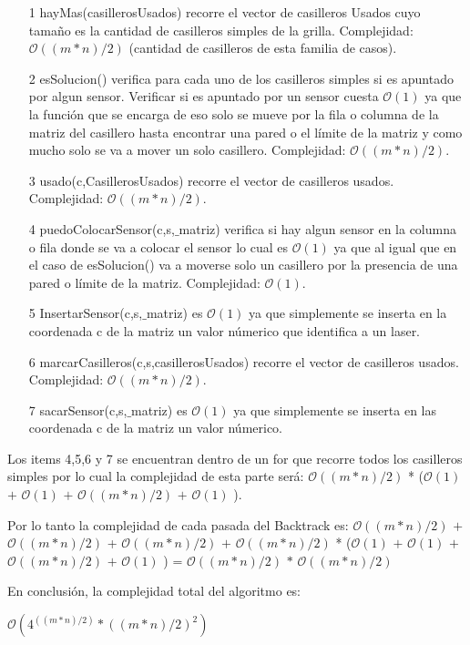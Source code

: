 \begin{itemize}
	\item[1] hayMas(casillerosUsados) recorre el vector de casilleros Usados cuyo tamaño es la cantidad de casilleros simples de la grilla. Complejidad: $\mathcal{O}((m*n)/2)$ (cantidad de casilleros de esta familia de casos).
	\item[2] esSolucion() verifica para cada uno de los casilleros simples si es apuntado por algun sensor. Verificar si es apuntado por un sensor cuesta $\mathcal{O}(1)$ ya que la función que se encarga de eso solo se mueve por la fila o columna de la matriz del casillero hasta encontrar una pared o el límite de la matriz y como mucho solo se va a mover un solo casillero. Complejidad: $\mathcal{O}((m*n)/2)$.
	\item[3] usado(c,CasillerosUsados) recorre el vector de casilleros usados. Complejidad: $\mathcal{O}((m*n)/2)$.
	\item[4] puedoColocarSensor(c,s,$\_$matriz) verifica si hay algun sensor en la columna o fila donde se va a colocar el sensor lo cual es $\mathcal{O}(1)$ ya que al igual que en el caso de esSolucion() va a moverse solo un casillero por la presencia de una pared o límite de la matriz. Complejidad: $\mathcal{O}(1)$.
	\item[5] InsertarSensor(c,s,$\_$matriz) es $\mathcal{O}(1)$ ya que simplemente se inserta en la coordenada c de la matriz un valor númerico que identifica a un laser.
	\item[6] marcarCasilleros(c,s,casillerosUsados) recorre el vector de casilleros usados. Complejidad: $\mathcal{O}((m*n)/2)$.
	\item[7] sacarSensor(c,s,$\_$matriz) es $\mathcal{O}(1)$ ya que simplemente se inserta en las coordenada c de la matriz un valor númerico.
\end{itemize}

Los items 4,5,6 y 7 se encuentran dentro de un for que recorre todos los casilleros simples por lo cual la complejidad de esta parte será: $\mathcal{O}((m*n)/2)$ * ($\mathcal{O}(1)$ $+$ $\mathcal{O}(1)$ $+$ $\mathcal{O}((m*n)/2)$ $+$ $\mathcal{O}(1)$ ).

Por lo tanto la complejidad de cada pasada del Backtrack es:
$\mathcal{O}((m*n)/2)$ $+$ $\mathcal{O}((m*n)/2)$ + $\mathcal{O}((m*n)/2)$ $+$ $\mathcal{O}((m*n)/2)$ * ($\mathcal{O}(1)$ $+$ $\mathcal{O}(1)$ $+$ $\mathcal{O}((m*n)/2)$ $+$ $\mathcal{O}(1)$ ) = $\mathcal{O}((m*n)/2)$ $*$ $\mathcal{O}((m*n)/2)$

En conclusión, la complejidad total del algoritmo es:

$\mathcal{O}(4^{((m*n)/2)}*((m*n)/2)^2)$
